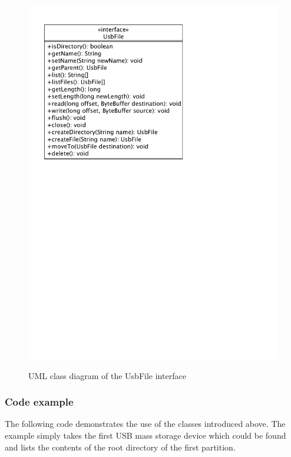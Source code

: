\begin{figure}[h!]
\caption{UML class diagram of the UsbFile interface}
\centering
\includegraphics[scale=0.85]{figures/usb_file}
\label{figure:usb_file}
\end{figure}

\subsubsection{Code example}

The following code demonstrates the use of the classes introduced above. The example simply takes the first USB mass storage device which could be found and lists the contents of the root directory of the first partition.

